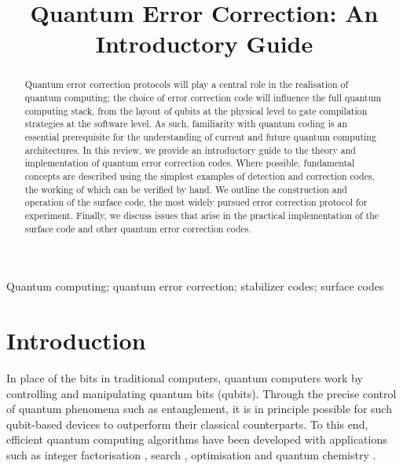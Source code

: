 \documentclass[]{arxiv}
\theoremstyle{plain}%
\theoremstyle{definition}
\theoremstyle{remark}
\begin{document}

\title{Quantum Error Correction: An Introductory Guide}

\author{
}

\maketitle

\begin{abstract}
Quantum error correction protocols will play a central role in the realisation of quantum computing; the choice of error correction code will influence the full quantum computing stack, from the layout of qubits at the physical level to gate compilation strategies at the software level. As such, familiarity with quantum coding is an essential prerequisite for the understanding of current and future quantum computing architectures. In this review, we provide an introductory guide to the theory and implementation of quantum error correction codes. Where possible, fundamental concepts are described using the simplest examples of detection and correction codes, the working of which can be verified by hand. We outline the construction and operation of the surface code, the most widely pursued error correction protocol for experiment. Finally, we discuss issues that arise in the practical implementation of the surface code and other quantum error correction codes.      

    
\end{abstract}

\begin{keywords}
Quantum computing; quantum error correction; stabilizer codes; surface codes
\end{keywords}


\section{Introduction}



In place of the bits in traditional computers, quantum computers work by controlling and manipulating quantum bits (qubits). Through the precise control of quantum phenomena such as entanglement, it is in principle possible for such qubit-based devices to outperform their classical counterparts. To this end, efficient quantum computing algorithms have been developed with applications such as integer factorisation \cite{Shor97}, search \cite{Grover96}, optimisation \cite{Schuld14} and quantum chemistry \cite{Aspuru-Guzik05}.
\end{document}
